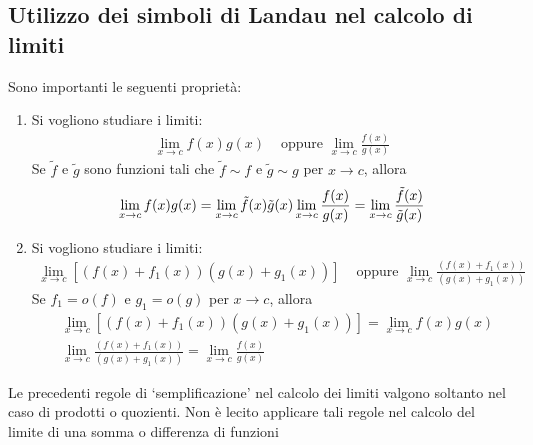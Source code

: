 \documentclass{book}
\begin{document}
\noindent\begin{minipage}{\textwidth}
    \begin{proposition}
        \subsection{Utilizzo dei simboli di Landau nel calcolo di limiti}
        Sono importanti le seguenti proprietà:
        \begin{enumerate}[label=\roman*., start=1]
            \item  Si vogliono studiare i limiti:
                  \begin{align*}
                      \lim_{x \to c} f(x)g(x) & \text{ oppure } \lim_{x \to c} \frac{f(x)}{g(x)}
                  \end{align*}
                  Se \(\tilde{f}\) e \(\tilde{g}\) sono funzioni tali che \(\tilde{f} \sim f\) e \(\tilde{g} \sim g\) per \(x \to c\), allora
                  \begin{equation*}
                      \lim_{x \to c} f(x)g(x) = \lim_{x \to c} \tilde{f}(x)\tilde{g}(x) \\
                      \lim_{x \to c} \frac{f(x)}{g(x)} = \lim_{x \to c} \frac{\tilde{f}(x)}{\tilde{g}(x)}
                  \end{equation*}
            \item Si vogliono studiare i limiti:
                  \begin{align*}
                      \lim_{x \to c} [(f(x) + f_1(x))(g(x) + g_1(x))] & \text{ oppure } \lim_{x \to c} \frac{(f(x) + f_1(x))}{(g(x) + g_1(x))}
                  \end{align*}
                  Se \(f_1 = o(f)\) e \(g_1 = o(g)\) per \(x \to c\), allora
                  \begin{align*}
                       & \lim_{x \to c} [(f(x) + f_1(x))(g(x) + g_1(x))]         = \lim_{x \to c} f(x)g(x)          \\
                       & \lim_{x \to c} \frac{(f(x) + f_1(x))}{(g(x) + g_1(x))}  = \lim_{x \to c} \frac{f(x)}{g(x)}
                  \end{align*}
        \end{enumerate}
    \end{proposition}
    Le precedenti regole di ‘semplificazione’ nel calcolo dei limiti valgono soltanto
    nel caso di prodotti o quozienti. Non è lecito applicare tali regole nel
    calcolo del limite di una somma o differenza di funzioni
\end{minipage}
\end{document}
